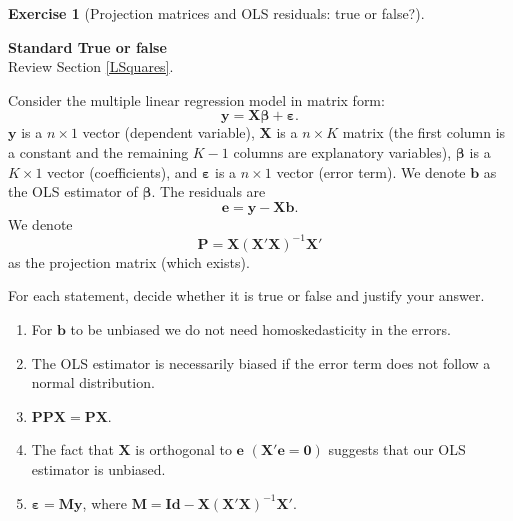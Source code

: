 \documentclass[
  11pt,
]{book}
\theoremstyle{definition}
\theoremstyle{definition}
\theoremstyle{definition}
\newtheorem{exercise}{Exercise}[chapter]
\theoremstyle{definition}
\theoremstyle{remark}
\begin{document}

\begin{exercisebox}

\begin{exercise}[Projection matrices and OLS residuals: true or false?]
\protect\hypertarget{exr:regressions-projection-matrix-true-false}{}\label{exr:regressions-projection-matrix-true-false}

\textbf{Standard \textbar{} True or false}\\
Review Section \ref{LSquares}.

Consider the multiple linear regression model in matrix form: \[\mathbf{y} = \mathbf{X}\boldsymbol{\beta} + \boldsymbol\varepsilon.\] \(\mathbf{y}\) is a \(n \times 1\) vector (dependent variable), \(\mathbf{X}\) is a \(n \times K\) matrix (the first column is a constant and the remaining \(K-1\) columns are explanatory variables), \(\boldsymbol{\beta}\) is a \(K \times 1\) vector (coefficients), and \(\boldsymbol\varepsilon\) is a \(n \times 1\) vector (error term). We denote \(\mathbf{b}\) as the OLS estimator of \(\boldsymbol{\beta}\). The residuals are \[\mathbf{e} = \mathbf{y} - \mathbf{X}\mathbf{b}.\] We denote \[\mathbf{P} = \mathbf{X}(\mathbf{X'X})^{-1}\mathbf{X'}\] as the projection matrix (which exists).

For each statement, decide whether it is true or false and justify your answer.

\begin{enumerate}
\def\labelenumi{\arabic{enumi}.}
\item
  For \(\mathbf{b}\) to be unbiased we do not need homoskedasticity in the errors.
\item
  The OLS estimator is necessarily biased if the error term does not follow a normal distribution.
\item
  \(\mathbf{PPX} = \mathbf{PX}\).
\item
  The fact that \(\mathbf{X}\) is orthogonal to \(\mathbf{e}\) \((\mathbf{X}'\mathbf{e} = \mathbf{0})\) suggests that our OLS estimator is unbiased.
\item
  \(\boldsymbol\varepsilon = \mathbf{My}\), where \(\mathbf{M} = \mathbf{Id} - \mathbf{X}(\mathbf{X'X})^{-1}\mathbf{X'}\).
\end{enumerate}

\end{exercise}

\end{exercisebox}

\end{document}
